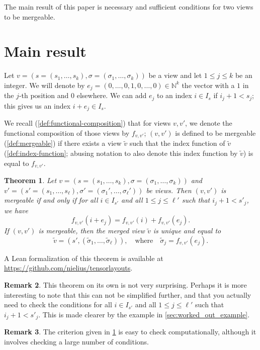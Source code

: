\documentclass{article}
\newtheorem{theorem}{Theorem}
\theoremstyle{definition} %
\newtheorem{remark}[theorem]{Remark}
\newcommand{\bN}{\mathbb{N}}
\begin{document}
The main result of this paper is necessary and sufficient conditions for two views to be mergeable.

\section{Main result}

Let $v = (s = (s_1, \ldots, s_k), \sigma = (\sigma_1, \ldots, \sigma_k))$ be a view
and let $1 \leq j \leq k$ be an integer.
We will denote by $e_j = (0, \ldots, 0, 1, 0, \ldots, 0) \in \bN^k$ the vector with a $1$ in the $j$-th position and $0$ elsewhere.
We can add $e_j$ to an index $i \in I_s$ if $i_j + 1 < s_j$; this gives us an index $i + e_j \in I_s$.

We recall (\cref{def:functional-composition})
that for views $v, v'$, we denote the functional composition of those views by $f_{v, v'}$;
$(v, v')$ is defined to be mergeable (\cref{def:mergeable}) if there exists a view $\tilde v$
such that the index function of $\tilde v$ (\cref{def:index-function}; abusing notation to also
denote this index function by $\tilde v$) 
is equal to $f_{v, v'}$.
\begin{theorem}
  \label{thm:main-theorem}
  Let $v = (s = (s_1, \ldots, s_k), \sigma = (\sigma_1, \ldots, \sigma_k))$
  and $v' = (s' = (s_1, \ldots, s_\ell), \sigma' = (\sigma_1', \ldots, \sigma_\ell'))$
  be views.
  Then $(v, v')$ is mergeable if and only if 
  for all $i \in I_{s'}$ and all $1 \leq j \leq \ell'$ such that $i_j + 1 < s'_j$,
  we have
  \[
    f_{v, v'}(i + e_j) = f_{v, v'}(i) + f_{v, v'}(e_j).
  \]
  If $(v, v')$ is mergeable, then the merged view $\tilde v$ is unique and equal to
  \[
    \tilde v = (s', (\tilde \sigma_1, \ldots, \tilde \sigma_\ell)), \quad \text{where} \quad 
    \tilde \sigma_j = f_{v, v'}(e_j).
  \]
\end{theorem}
A Lean formalization of this theorem is available at \url{https://github.com/nielius/tensorlayouts}.

\begin{remark}
  This theorem on its own is not very surprising.
  Perhaps it is more interesting to note that this can not be simplified further,
  and that you actually need to check the conditions for all $i \in I_{s'}$ and all $1 \leq j \leq \ell'$ such that $i_j + 1 < s'_j$.
  This is made clearer by the example in \cref{sec:worked_out_example}.
\end{remark}

\begin{remark}
  The criterion given in \cref{thm:main-theorem} is easy to check computationally,
  although it involves checking a large number of conditions.
\end{remark}
\end{document}
